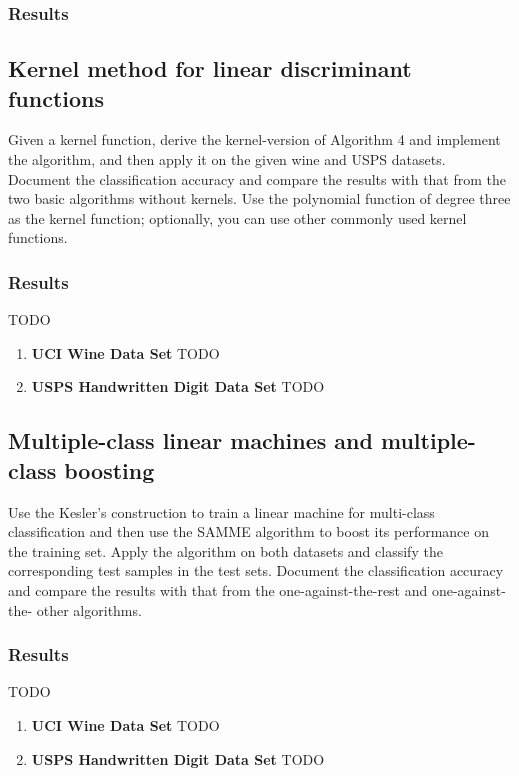 \documentclass{article}
\begin{document}
\subsubsection{Results}


\subsection{Kernel method for linear discriminant functions}
Given a kernel function, derive the kernel-version of Algorithm 4 and implement the algorithm, and then apply it on the given wine and USPS datasets. Document the classification accuracy and compare the results with that from the two basic algorithms without kernels. Use the polynomial function of degree three as the kernel function; optionally, you can use other commonly used kernel functions.

\subsubsection{Results}
{\large TODO}
\begin{enumerate}
\item {\bf UCI Wine Data Set}
{\large TODO}
\item {\bf USPS Handwritten Digit Data Set}
{\large TODO}
\end{enumerate}


\subsection{Multiple-class linear machines and multiple-class boosting}
Use the Kesler’s construction to train a linear machine for multi-class classification and then use the SAMME algorithm to boost its performance on the training set. Apply the algorithm on both datasets and classify the corresponding test samples in the test sets. Document the classification accuracy and compare the results with that from the one-against-the-rest and one-against-the- other algorithms.

\subsubsection{Results}
{\large TODO}
\begin{enumerate}
\item {\bf UCI Wine Data Set}
{\large TODO}
\item {\bf USPS Handwritten Digit Data Set}
{\large TODO}
\end{enumerate}
\end{document}
